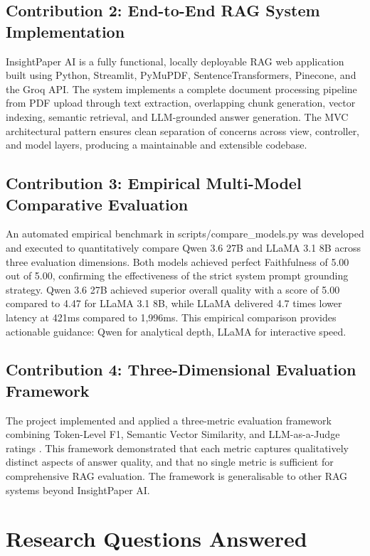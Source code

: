 \subsection{Contribution 2: End-to-End RAG System Implementation}

InsightPaper AI is a fully functional, locally deployable RAG web application built using Python, Streamlit, PyMuPDF, SentenceTransformers, Pinecone, and the Groq API. The system implements a complete document processing pipeline from PDF upload through text extraction, overlapping chunk generation, vector indexing, semantic retrieval, and LLM-grounded answer generation. The MVC architectural pattern ensures clean separation of concerns across view, controller, and model layers, producing a maintainable and extensible codebase.

\subsection{Contribution 3: Empirical Multi-Model Comparative Evaluation}

An automated empirical benchmark in scripts/compare\_models.py was developed and executed to quantitatively compare Qwen 3.6 27B and LLaMA 3.1 8B across three evaluation dimensions. Both models achieved perfect Faithfulness of 5.00 out of 5.00, confirming the effectiveness of the strict system prompt grounding strategy. Qwen 3.6 27B achieved superior overall quality with a score of 5.00 compared to 4.47 for LLaMA 3.1 8B, while LLaMA delivered 4.7 times lower latency at 421ms compared to 1,996ms. This empirical comparison provides actionable guidance: Qwen for analytical depth, LLaMA for interactive speed.

\subsection{Contribution 4: Three-Dimensional Evaluation Framework}

The project implemented and applied a three-metric evaluation framework combining Token-Level F1, Semantic Vector Similarity, and LLM-as-a-Judge ratings \citep{zheng2023judging}. This framework demonstrated that each metric captures qualitatively distinct aspects of answer quality, and that no single metric is sufficient for comprehensive RAG evaluation. The framework is generalisable to other RAG systems beyond InsightPaper AI.

\section{Research Questions Answered}

